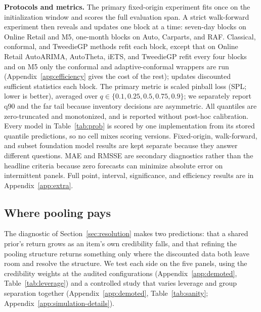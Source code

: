 \textbf{Protocols and metrics.} The primary fixed-origin experiment fits
once on the initialization window and scores the full evaluation span.
A strict walk-forward experiment then reveals and updates one block at a
time: seven-day blocks on Online Retail and M5, one-month blocks on Auto,
Carparts, and RAF. Classical, conformal, and TweedieGP methods refit each
block, except that on Online Retail AutoARIMA, AutoTheta, iETS, and
TweedieGP refit every four blocks and on M5 only the conformal and
adaptive-conformal wrappers are run (Appendix~\ref{app:efficiency} gives
the cost of the rest); \EBB{} updates discounted sufficient statistics
each block. The primary metric is
scaled pinball loss (SPL; lower is better), averaged over
$q\in\{0.1,0.25,0.5,0.75,0.9\}$; we separately report q90 and the far tail
because inventory decisions are asymmetric. All quantiles are
zero-truncated and monotonized, and \EBB{} is reported without post-hoc
calibration. Every model in Table~\ref{tab:prob} is scored by one
implementation from its stored quantile predictions, so no cell mixes
scoring versions. Fixed-origin, walk-forward, and subset foundation model
results are kept separate because they answer different questions. MAE and
RMSSE are secondary diagnostics rather than the headline criteria because
zero forecasts can minimize absolute error on intermittent panels. Full
point, interval, significance, and efficiency results are in
Appendix~\ref{app:extra}.



\subsection{Where pooling pays}\label{sec:pays}

The diagnostic of Section~\ref{sec:resolution} makes two predictions:
that a shared prior's return grows as an item's own credibility falls, and
that refining the pooling structure returns something only where the
discounted data both leave room and resolve the structure. We test each
side on the five panels, using the credibility weights at the audited
configurations (Appendix~\ref{app:demoted}, Table~\ref{tab:leverage})
and a controlled study that varies leverage and group separation together
(Appendix~\ref{app:demoted}, Table~\ref{tab:sanity};
Appendix~\ref{app:simulation-details}).


